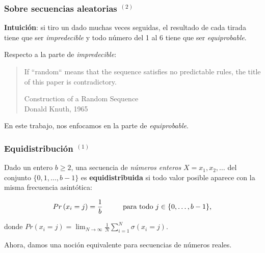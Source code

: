 \documentclass[t, 10pt, mathserif]{beamer}
\begin{document}

\begin{frame}
  \frametitle{Sobre secuencias aleatorias {$^{(2)}$}}

  \textbf{Intuición}: si tiro un dado muchas veces seguidas, el resultado de cada tirada tiene que ser \textit{impredecible} y todo número del 1 al 6 tiene que ser \textit{equiprobable}.
  \pause

  Respecto a la parte de \textit{impredecible}:
  \begin{quote}
    If ``random`` means that the sequence satisfies no predictable rules, the title of this paper is contradictory.
    \begin{flushright}
      \small{Construction of a Random Sequence \\}
      \small{Donald Knuth, 1965}
    \end{flushright}
  \end{quote}
  \pause

  En este trabajo, nos enfocamos en la parte de \textit{equiprobable}.
\end{frame}


\begin{frame}
  \frametitle{Equidistribución {$^{(1)}$}}

  Dado un entero $b \ge 2$, una secuencia de \textit{números enteros} $X = x_1, x_2, \dots$ del conjunto $\{ 0, 1, \dots, b - 1 \}$ es \textbf{equidistribuida} si todo valor posible aparece con la misma frecuencia asintótica:
  \pause

  \begin{equation*}
    \begin{aligned}
      Pr \left( x_i = j \right) = \frac{1}{b} \hspace*{1cm} \text{para todo } j \in \{ 0, \dots, b - 1 \} \text{,}
    \end{aligned}
  \end{equation*}
  \pause

  \vspace{-0.5cm}
  donde $\displaystyle Pr(x_i = j) = \lim_{N \to \infty} \frac{1}{N} \sum_{i = 1}^{N} \sigma(x_i = j)$.
  \pause

  Ahora, damos una noción equivalente para secuencias de números reales.
\end{frame}
\end{document}
